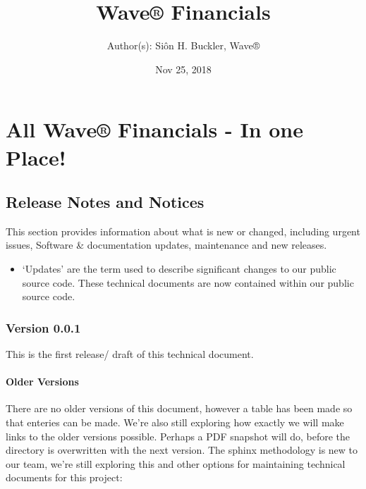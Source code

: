 \documentclass[letterpaper,10pt,english]{sphinxmanual}
\title{Wave® Financials}
\date{Nov 25, 2018}
\author{Author(s): Siôn H. Buckler, Wave®}
\begin{document}
\pagestyle{empty}
\maketitle
\pagestyle{plain}
\sphinxtableofcontents
\pagestyle{normal}
\label{\detokenize{index::doc}}



\chapter{All Wave® Financials - In one Place!}
\label{\detokenize{index:all-wave-financials-in-one-place}}

\section{Release Notes and Notices}
\label{\detokenize{releasenotes:release-notes-and-notices}}\label{\detokenize{releasenotes::doc}}
This section provides information about what is new or changed, including urgent issues, Software \& documentation updates, maintenance and new releases.
\begin{itemize}
\item {} 
‘Updates’ are the term used to describe significant changes to our public source code. These technical documents are now contained within our public source code.

\end{itemize}


\subsection{Version 0.0.1}
\label{\detokenize{releasenotes:version-0-0-1}}
This is the first release/ draft of this technical document.


\subsubsection{Older Versions}
\label{\detokenize{releasenotes:older-versions}}
There are no older versions of this document, however a table has been made so that enteries can be made. We’re also still exploring how exactly we will make links to the older versions possible. Perhaps a PDF snapshot will do, before the directory is overwritten with the next version. The sphinx methodology is new to our team, we’re still exploring this and other options for maintaining technical documents for this project:
\end{document}
